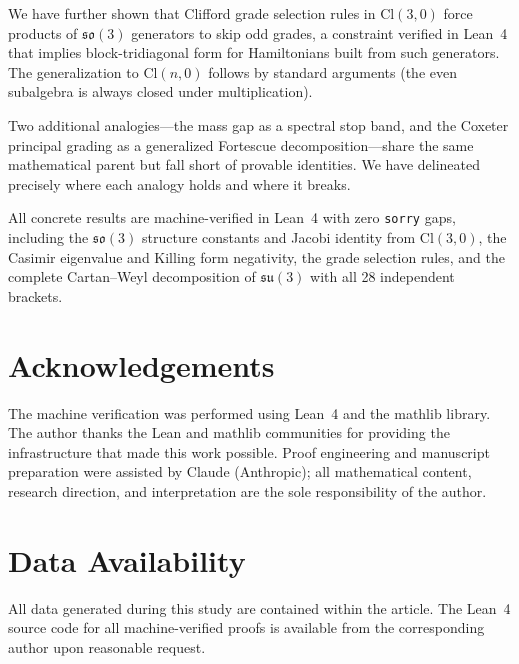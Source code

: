 \documentclass[11pt]{article}
\newenvironment{acknowledgements}{\section*{Acknowledgements}}{}
\newcommand{\so}{\mathfrak{so}}
\newcommand{\su}{\mathfrak{su}}
\newcommand{\Cl}{\mathrm{Cl}}
\begin{document}
We have further shown that Clifford grade selection rules in $\Cl(3,0)$
force products of $\so(3)$ generators to skip odd grades, a constraint
verified in Lean~4 that implies block-tridiagonal form for Hamiltonians
built from such generators. The generalization to $\Cl(n,0)$ follows
by standard arguments (the even subalgebra is always closed under
multiplication).

Two additional analogies---the mass gap as a spectral stop band, and
the Coxeter principal grading as a generalized Fortescue
decomposition---share the same mathematical parent but fall short of
provable identities. We have delineated precisely where each analogy
holds and where it breaks.

All concrete results are machine-verified in Lean~4 with zero
\texttt{sorry} gaps, including the $\so(3)$ structure constants and
Jacobi identity from $\Cl(3,0)$, the Casimir eigenvalue and Killing
form negativity, the grade selection rules, and the complete
Cartan--Weyl decomposition of $\su(3)$ with all 28 independent
brackets.

\begin{acknowledgements}
The machine verification was performed using Lean~4 and the mathlib
library. The author thanks the Lean and mathlib communities for
providing the infrastructure that made this work possible.
Proof engineering and manuscript preparation were assisted by Claude
(Anthropic); all mathematical content, research direction, and
interpretation are the sole responsibility of the author.
\end{acknowledgements}

\section*{Data Availability}
All data generated during this study are contained within the article.
The Lean~4 source code for all machine-verified proofs is available from
the corresponding author upon reasonable request.

\end{document}

